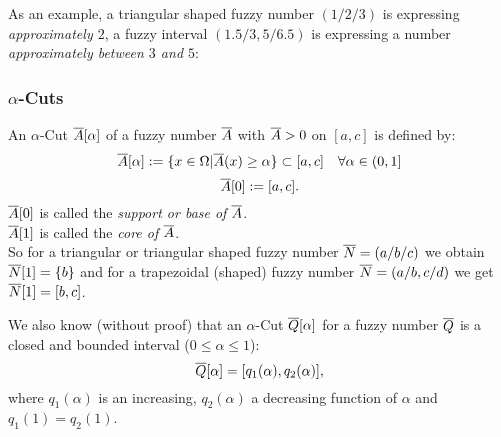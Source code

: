 As an example, a triangular shaped fuzzy number $(1/2/3)$ is expressing \emph{approximately $2$}, a fuzzy interval $(1.5/3,5/6.5)$ is expressing a number \emph{approximately between $3$ and $5$}:
\begin{figure}[H]
\centering
{}
\end{figure} \FigureHSpace

\subsubsection{$\alpha$-Cuts} \label{sec:alphaCuts}
An $\alpha$-Cut $\overline{A}[\alpha]$ of a fuzzy number $\overline{A}$ with $\overline{A}>0$ on $[a,c]$ is defined by:
\[ \overline{A}[\alpha] := \{ x\in\Omega | \overline{A}(x)\geq\alpha \}\subset[a,c] \quad \forall\alpha\in(0,1] \]
\[ \overline{A}[0] := [a,c]. \]
$\overline{A}[0]$ is called the \emph{support or base of $\overline{A}$}.\\
$\overline{A}[1]$ is called the \emph{core of $\overline{A}$}.\\
So for a triangular or triangular shaped fuzzy number $\overline{N}=(a/b/c)$ we obtain $\overline{N}[1]=\{b\}$ and %
for a trapezoidal (shaped) fuzzy number $\overline{N}=(a/b,c/d)$ we get $\overline{N}[1]=[b,c]$.

We also know (without proof) that an $\alpha$-Cut $\overline{Q}[\alpha]$ for a fuzzy number $\overline{Q}$
is a closed and bounded interval ($0\leq\alpha\leq 1$):
\[ \overline{Q}[\alpha]=[q_1(\alpha), q_2(\alpha)], \]
where $q_1(\alpha)$ is an increasing, $q_2(\alpha)$ a decreasing function of $\alpha$ and $q_1(1)=q_2(1)$.



